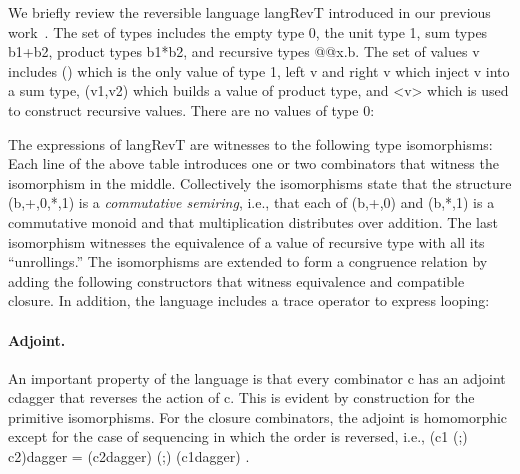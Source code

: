 \documentclass{llncs}
\begin{document}
We briefly review the reversible language {{langRevT}} introduced in our
previous work~\cite{rc2011,James:2012:IE:2103656.2103667}. The set of types
includes the empty type {{0}}, the unit type {{1}}, sum types {{b1+b2}},
product types {{b1*b2}}, and recursive types {{@@x.b}}. The set of values
{{v}} includes {{()}} which is the only value of type {{1}}, {{left v}} and
{{right v}} which inject {{v}} into a sum type, {{(v1,v2)}} which builds a
value of product type, and {{<v>}} which is used to construct recursive
values. There are no values of type {{0}}:

The expressions of {{langRevT}} are witnesses to the following type
isomorphisms:
Each line of the above table introduces one or two combinators that witness
the isomorphism in the middle. Collectively the isomorphisms state that the
structure {{(b,+,0,*,1)}} is a \emph{commutative semiring}, i.e., that each
of {{(b,+,0)}} and {{(b,*,1)}} is a commutative monoid and that
multiplication distributes over addition. The last isomorphism witnesses the
equivalence of a value of recursive type with all its ``unrollings.'' The
isomorphisms are extended to form a congruence relation by adding the
following constructors that witness equivalence and compatible closure. In
addition, the language includes a {{trace}} operator to express looping:
%
%
%
%

\paragraph*{Adjoint.} 
An important property of the language is that every combinator {{c}} has an
adjoint {{c{dagger}}} that reverses the action of {{c}}. This is evident by
construction for the primitive isomorphisms. For the closure combinators, the
adjoint is homomorphic except for the case of sequencing in which the order
is reversed, i.e., {{(c1 (;) c2){dagger} = (c2{dagger}) (;) (c1{dagger}) }}.
\end{document}
